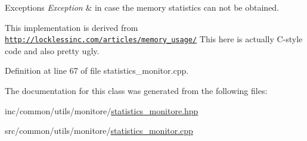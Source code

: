 \begin{DoxyExceptions}{Exceptions}
{\em Exception} & in case the memory statistics can not be obtained.\\
\hline
\end{DoxyExceptions}
This implementation is derived from \href{http://locklessinc.com/articles/memory_usage/}{\tt http\+://locklessinc.\+com/articles/memory\+\_\+usage/} This here is actually C-\/style code and also pretty ugly. 

Definition at line 67 of file statistics\+\_\+monitor.\+cpp.



The documentation for this class was generated from the following files\+:\begin{DoxyCompactItemize}
\item 
inc/common/utils/monitore/\hyperlink{statistics__monitore_8hpp}{statistics\+\_\+monitore.\+hpp}\item 
src/common/utils/monitore/\hyperlink{statistics__monitor_8cpp}{statistics\+\_\+monitor.\+cpp}\end{DoxyCompactItemize}
